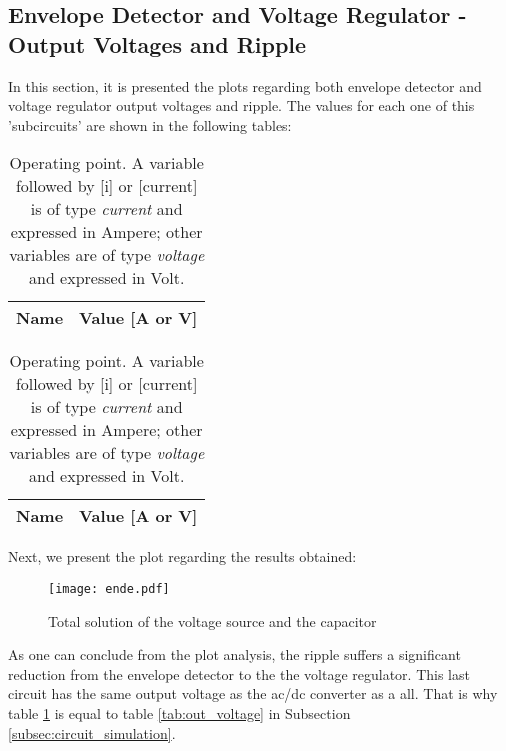 \newpage
\subsection{Envelope Detector and Voltage Regulator - Output Voltages and Ripple}

\par In this section, it is presented the plots regarding both envelope detector and voltage regulator output voltages and ripple.
The values for each one of this 'subcircuits' are shown in the following tables:

\begin{table}[H]
  \centering
  \begin{tabular}{|l|r|}
    \hline    
    {\bf Name} & {\bf Value [A or V]} \\ \hline
    
  \end{tabular}
  \caption{Operating point. A variable followed by [i] or [current] is of type {\em current}
    and expressed in Ampere; other variables are of type {\it voltage} and expressed in
    Volt.}
  \label{tab:out_voltage2}
\end{table}


\begin{table}[H]
  \centering
  \begin{tabular}{|l|r|}
    \hline    
    {\bf Name} & {\bf Value [A or V]} \\ \hline
    
  \end{tabular}
  \caption{Operating point. A variable followed by [i] or [current] is of type {\em current}
    and expressed in Ampere; other variables are of type {\it voltage} and expressed in
    Volt.}
  \label{tab:out_env}
\end{table}

Next, we present the plot regarding the results obtained:

\begin{figure}[H] \centering
\texttt{[image: ende.pdf]}
\caption{Total solution of the voltage source and the capacitor}
\label{fig:env+vore}
\end{figure}


As one can conclude from the plot analysis, the ripple suffers a significant reduction from the envelope detector to the the voltage regulator. This last circuit has the same output voltage as the ac/dc converter as a all. That is why table \ref{tab:out_voltage2} is equal to table \ref{tab:out_voltage} in Subsection \ref{subsec:circuit_simulation}.



